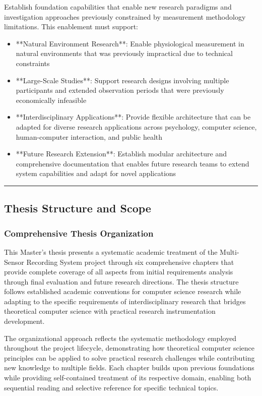\documentclass[12pt,a4paper]{report}
\begin{document}
Establish foundation capabilities that enable new research paradigms and investigation approaches previously constrained
by measurement methodology limitations. This enablement must support:

\begin{itemize}
\item **Natural Environment Research**: Enable physiological measurement in natural environments that was previously
  impractical due to technical constraints
\item **Large-Scale Studies**: Support research designs involving multiple participants and extended observation periods
  that were previously economically infeasible
\item **Interdisciplinary Applications**: Provide flexible architecture that can be adapted for diverse research
  applications across psychology, computer science, human-computer interaction, and public health
\item **Future Research Extension**: Establish modular architecture and comprehensive documentation that enables future
  research teams to extend system capabilities and adapt for novel applications

\end{itemize}
\hrule

\subsection{Thesis Structure and Scope}

\subsubsection{Comprehensive Thesis Organization}

This Master's thesis presents a systematic academic treatment of the Multi-Sensor Recording System project through six
comprehensive chapters that provide complete coverage of all aspects from initial requirements analysis through final
evaluation and future research directions. The thesis structure follows established academic conventions for computer
science research while adapting to the specific requirements of interdisciplinary research that bridges theoretical
computer science with practical research instrumentation development.

The organizational approach reflects the systematic methodology employed throughout the project lifecycle, demonstrating
how theoretical computer science principles can be applied to solve practical research challenges while contributing new
knowledge to multiple fields. Each chapter builds upon previous foundations while providing self-contained treatment of
its respective domain, enabling both sequential reading and selective reference for specific technical topics.
\end{document}
